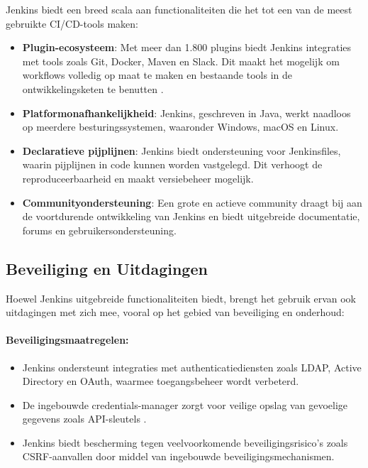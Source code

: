 Jenkins biedt een breed scala aan functionaliteiten die het tot een van de meest gebruikte CI/CD-tools maken:
\begin{itemize}
    \item \textbf{Plugin-ecosysteem}: Met meer dan 1.800 plugins biedt Jenkins integraties met tools zoals Git, Docker, Maven en Slack. Dit maakt het mogelijk om workflows volledig op maat te maken en bestaande tools in de ontwikkelingsketen te benutten \autocite{shahin2017}.
    \item \textbf{Platformonafhankelijkheid}: Jenkins, geschreven in Java, werkt naadloos op meerdere besturingssystemen, waaronder Windows, macOS en Linux.
    \item \textbf{Declaratieve pijplijnen}: Jenkins biedt ondersteuning voor Jenkinsfiles, waarin pijplijnen in code kunnen worden vastgelegd. Dit verhoogt de reproduceerbaarheid en maakt versiebeheer mogelijk.
    \item \textbf{Communityondersteuning}: Een grote en actieve community draagt bij aan de voortdurende ontwikkeling van Jenkins en biedt uitgebreide documentatie, forums en gebruikersondersteuning.
\end{itemize}

\subsection{Beveiliging en Uitdagingen}

Hoewel Jenkins uitgebreide functionaliteiten biedt, brengt het gebruik ervan ook uitdagingen met zich mee, vooral op het gebied van beveiliging en onderhoud:

\paragraph{Beveiligingsmaatregelen:}
\begin{itemize}
    \item Jenkins ondersteunt integraties met authenticatiediensten zoals LDAP, Active Directory en OAuth, waarmee toegangsbeheer wordt verbeterd.
    \item De ingebouwde credentials-manager zorgt voor veilige opslag van gevoelige gegevens zoals API-sleutels \autocite{amaral2021}.
    \item Jenkins biedt bescherming tegen veelvoorkomende beveiligingsrisico's zoals CSRF-aanvallen door middel van ingebouwde beveiligingsmechanismen.
\end{itemize}

